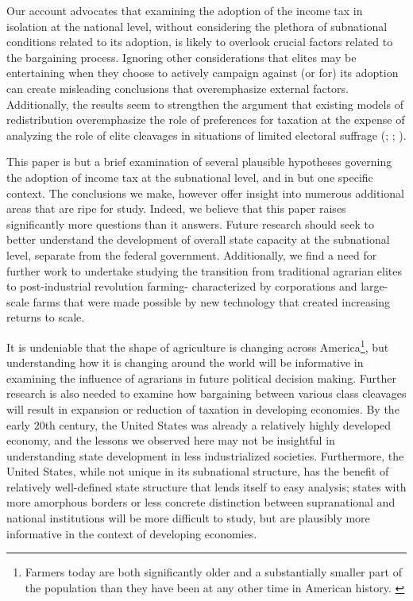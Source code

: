 \documentclass[letter, 12pt]{article}
\begin{document}
Our account advocates that examining the adoption of the income tax in isolation at the national level, without considering the plethora of subnational conditions related to its adoption, is likely to overlook crucial factors related to the bargaining process. Ignoring other considerations that elites may be entertaining when they choose to actively campaign against (or for) its adoption can create misleading conclusions that overemphasize external factors. Additionally, the results seem to strengthen the argument that existing models of redistribution overemphasize the role of preferences for taxation at the expense of analyzing the role of elite cleavages in situations of limited electoral suffrage (\citealt{mares2015non}; \citealt{ansell2014inequality}; \citealt{aidt2009taxman}). 

This paper is but a brief examination of several plausible hypotheses governing the adoption of income tax at the subnational level, and in but one specific context. The conclusions we make, however offer insight into numerous additional areas that are ripe for study. Indeed, we believe that this paper raises significantly more questions than it answers. Future research should seek to better understand the development of overall state capacity at the subnational level, separate from the federal government. Additionally, we find a need for further work to undertake studying the transition from traditional agrarian elites to post-industrial revolution farming- characterized by corporations and large-scale farms that were made possible by new technology that created increasing returns to scale. 

It is undeniable that the shape of agriculture is changing across America\footnote{Farmers today are both significantly older and a substantially smaller part of the population than they have been at any other time in American history. \citealt{tariffs}}, but understanding how it is changing around the world will be informative in examining the influence of agrarians in future political decision making. Further research is also needed to examine how bargaining between various class cleavages will result in expansion or reduction of taxation in developing economies. By the early 20th century, the United States was already a relatively highly developed economy, and the lessons we observed here may not be insightful in understanding state development in less industrialized societies. Furthermore, the United States, while not unique in its subnational structure, has the benefit of relatively well-defined state structure that lends itself to easy analysis; states with more amorphous borders or less concrete distinction between supranational and national institutions will be more difficult to study, but are plausibly more informative in the context of developing economies.
\end{document}
